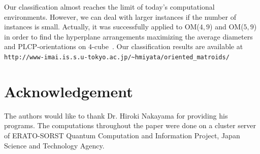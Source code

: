 \documentclass{article}
\begin{document}
Our classification almost reaches the limit of today's computational environments.
However, we can deal with larger instances if the number of instances is small.
Actually, it was successfully applied to OM($4,9$) and OM($5,9$) in order to find the hyperplane arrangements
maximizing the average diameters~\cite{DMMX10} and PLCP-orientations on $4$-cube~\cite{FKM}.
Our classification results are available at\\
{\tt http://www-imai.is.s.u-tokyo.ac.jp/\~{}hmiyata/oriented\_matroids/}

\section*{Acknowledgement}
The authors would like to thank Dr. Hiroki Nakayama for providing his programs.
The computations throughout the paper were done on a cluster server of ERATO-SORST
Quantum Computation and Information Project, Japan Science and Technology Agency.
\end{document}
